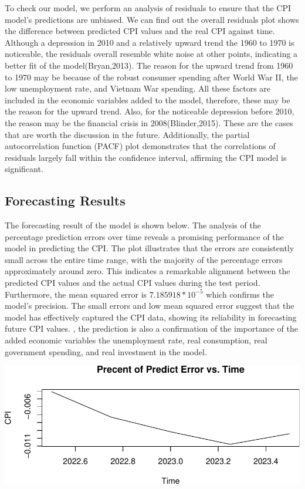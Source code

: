 \documentclass[
  man,floatsintext,
  man]{apa6}
\begin{document}
To check our model, we perform an analysis of residuals to ensure that the CPI model's predictions are unbiased. We can find out the overall residuals plot shows the difference between predicted CPI values and the real CPI against time. Although a depression in 2010 and a relatively upward trend the 1960 to 1970 is noticeable, the residuals overall resemble white noise at other points, indicating a better fit of the model(Bryan,2013). The reason for the upward trend from 1960 to 1970 may be because of the robust consumer spending after World War II, the low unemployment rate, and Vietnam War spending. All these factors are included in the economic variables added to the model, therefore, these may be the reason for the upward trend. Also, for the noticeable depression before 2010, the reason may be the financial crisis in 2008(Blinder,2015). These are the cases that are worth the discussion in the future. Additionally, the partial autocorrelation function (PACF) plot demonstrates that the correlations of residuals largely fall within the confidence interval, affirming the CPI model is significant.

\subsection{Forecasting Results}\label{forecasting-results}

The forecasting result of the model is shown below. The analysis of the percentage prediction errors over time reveals a promising performance of the model in predicting the CPI. The plot illustrates that the errors are consistently small across the entire time range, with the majority of the percentage errors approximately around zero. This indicates a remarkable alignment between the predicted CPI values and the actual CPI values during the test period. Furthermore, the mean squared error is \(7.185918*10^{-5}\) which confirms the model's precision. The small errors and low mean squared error suggest that the model has effectively captured the CPI data, showing its reliability in forecasting future CPI values. , the prediction is also a confirmation of the importance of the added economic variables the unemployment rate, real consumption, real government spending, and real investment in the model.

\includegraphics{stat429_group2_final_proj_files/figure-latex/unnamed-chunk-7-1.pdf}
\end{document}
